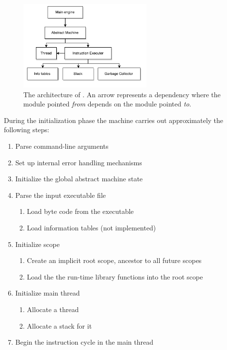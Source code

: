 \begin{figure}
  \centering
  \includegraphics[width=0.6\textwidth]{figures/arch}
  \caption{The architecture of \thename{}. An arrow represents a dependency
    where the module pointed \emph{from} depends on the module pointed
    \emph{to}.}
  \label{fig:implementation:arch}
\end{figure}

During the initialization phase the machine carries out approximately the
following steps:

\begin{enumerate}
\item Parse command-line arguments
\item Set up internal error handling mechanisms
\item Initialize the global abstract machine state
\item Parse the input executable file
  \begin{enumerate}
  \item Load byte code from the executable
  \item Load information tables (not implemented)
  \end{enumerate}
\item Initialize scope
  \begin{enumerate}
  \item Create an implicit root scope, ancestor to all future scopes
  \item Load the the run-time library functions into the root scope
  \end{enumerate}
\item Initialize main thread
  \begin{enumerate}
  \item Allocate a thread
  \item Allocate a stack for it
  \end{enumerate}
\item Begin the instruction cycle in the main thread
\end{enumerate}

